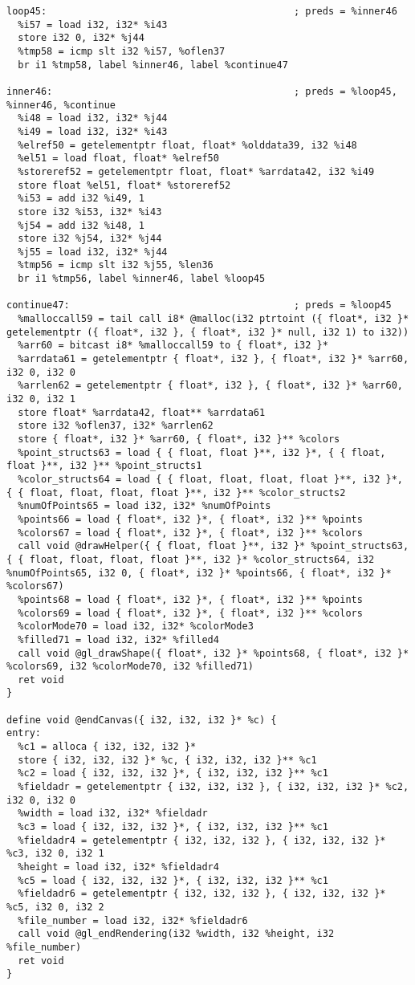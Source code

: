 \documentclass[main.tex]{subfiles}
\begin{document}
{\begin{lstlisting}
loop45:                                           ; preds = %inner46
  %i57 = load i32, i32* %i43
  store i32 0, i32* %j44
  %tmp58 = icmp slt i32 %i57, %oflen37
  br i1 %tmp58, label %inner46, label %continue47

inner46:                                          ; preds = %loop45, %inner46, %continue
  %i48 = load i32, i32* %j44
  %i49 = load i32, i32* %i43
  %elref50 = getelementptr float, float* %olddata39, i32 %i48
  %el51 = load float, float* %elref50
  %storeref52 = getelementptr float, float* %arrdata42, i32 %i49
  store float %el51, float* %storeref52
  %i53 = add i32 %i49, 1
  store i32 %i53, i32* %i43
  %j54 = add i32 %i48, 1
  store i32 %j54, i32* %j44
  %j55 = load i32, i32* %j44
  %tmp56 = icmp slt i32 %j55, %len36
  br i1 %tmp56, label %inner46, label %loop45

continue47:                                       ; preds = %loop45
  %malloccall59 = tail call i8* @malloc(i32 ptrtoint ({ float*, i32 }* getelementptr ({ float*, i32 }, { float*, i32 }* null, i32 1) to i32))
  %arr60 = bitcast i8* %malloccall59 to { float*, i32 }*
  %arrdata61 = getelementptr { float*, i32 }, { float*, i32 }* %arr60, i32 0, i32 0
  %arrlen62 = getelementptr { float*, i32 }, { float*, i32 }* %arr60, i32 0, i32 1
  store float* %arrdata42, float** %arrdata61
  store i32 %oflen37, i32* %arrlen62
  store { float*, i32 }* %arr60, { float*, i32 }** %colors
  %point_structs63 = load { { float, float }**, i32 }*, { { float, float }**, i32 }** %point_structs1
  %color_structs64 = load { { float, float, float, float }**, i32 }*, { { float, float, float, float }**, i32 }** %color_structs2
  %numOfPoints65 = load i32, i32* %numOfPoints
  %points66 = load { float*, i32 }*, { float*, i32 }** %points
  %colors67 = load { float*, i32 }*, { float*, i32 }** %colors
  call void @drawHelper({ { float, float }**, i32 }* %point_structs63, { { float, float, float, float }**, i32 }* %color_structs64, i32 %numOfPoints65, i32 0, { float*, i32 }* %points66, { float*, i32 }* %colors67)
  %points68 = load { float*, i32 }*, { float*, i32 }** %points
  %colors69 = load { float*, i32 }*, { float*, i32 }** %colors
  %colorMode70 = load i32, i32* %colorMode3
  %filled71 = load i32, i32* %filled4
  call void @gl_drawShape({ float*, i32 }* %points68, { float*, i32 }* %colors69, i32 %colorMode70, i32 %filled71)
  ret void
}

define void @endCanvas({ i32, i32, i32 }* %c) {
entry:
  %c1 = alloca { i32, i32, i32 }*
  store { i32, i32, i32 }* %c, { i32, i32, i32 }** %c1
  %c2 = load { i32, i32, i32 }*, { i32, i32, i32 }** %c1
  %fieldadr = getelementptr { i32, i32, i32 }, { i32, i32, i32 }* %c2, i32 0, i32 0
  %width = load i32, i32* %fieldadr
  %c3 = load { i32, i32, i32 }*, { i32, i32, i32 }** %c1
  %fieldadr4 = getelementptr { i32, i32, i32 }, { i32, i32, i32 }* %c3, i32 0, i32 1
  %height = load i32, i32* %fieldadr4
  %c5 = load { i32, i32, i32 }*, { i32, i32, i32 }** %c1
  %fieldadr6 = getelementptr { i32, i32, i32 }, { i32, i32, i32 }* %c5, i32 0, i32 2
  %file_number = load i32, i32* %fieldadr6
  call void @gl_endRendering(i32 %width, i32 %height, i32 %file_number)
  ret void
}


\end{lstlisting}}
\end{document}
